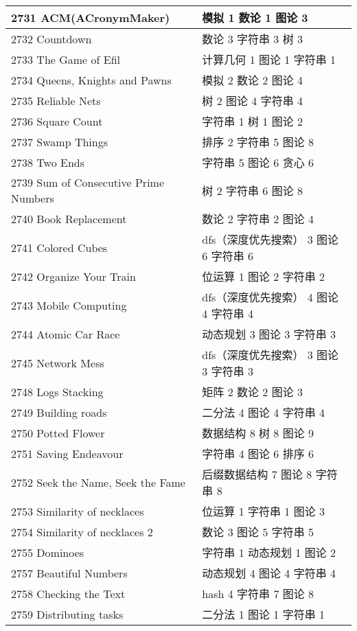 \begin{longtable}{| p{} | p{} |}
 2731 ACM(ACronymMaker)  & 模拟 1 数论 1 图论 3 \\ \hline
 2732 Countdown  & 数论 3 字符串 3 树 3 \\ \hline
 2733 The Game of Efil  & 计算几何 1 图论 1 字符串 1 \\ \hline
 2734 Queens, Knights and Pawns  & 模拟 2 数论 2 图论 4 \\ \hline
 2735 Reliable Nets  & 树 2 图论 4 字符串 4 \\ \hline
 2736 Square Count  & 字符串 1 树 1 图论 2 \\ \hline
 2737 Swamp Things  & 排序 2 字符串 5 图论 8 \\ \hline
 2738 Two Ends  & 字符串 5 图论 6 贪心 6 \\ \hline
 2739 Sum of Consecutive Prime Numbers  & 树 2 字符串 6 图论 8 \\ \hline
 2740 Book Replacement  & 数论 2 字符串 2 图论 4 \\ \hline
 2741 Colored Cubes  & dfs（深度优先搜索） 3 图论 6 字符串 6 \\ \hline
 2742 Organize Your Train  & 位运算 1 图论 2 字符串 2 \\ \hline
 2743 Mobile Computing  & dfs（深度优先搜索） 4 图论 4 字符串 4 \\ \hline
 2744 Atomic Car Race  & 动态规划 3 图论 3 字符串 3 \\ \hline
 2745 Network Mess  & dfs（深度优先搜索） 3 图论 3 字符串 3 \\ \hline
 2748 Logs Stacking  & 矩阵 2 数论 2 图论 3 \\ \hline
 2749 Building roads  & 二分法 4 图论 4 字符串 4 \\ \hline
 2750 Potted Flower  & 数据结构 8 树 8 图论 9 \\ \hline
 2751 Saving Endeavour  & 字符串 4 图论 6 排序 6 \\ \hline
 2752 Seek the Name, Seek the Fame  & 后缀数据结构 7 图论 8 字符串 8 \\ \hline
 2753 Similarity of necklaces  & 位运算 1 字符串 1 图论 3 \\ \hline
 2754 Similarity of necklaces 2  & 数论 3 图论 5 字符串 5 \\ \hline
 2755 Dominoes  & 字符串 1 动态规划 1 图论 2 \\ \hline
 2757 Beautiful Numbers  & 动态规划 4 图论 4 字符串 4 \\ \hline
 2758 Checking the Text  & hash 4 字符串 7 图论 8 \\ \hline
 2759 Distributing tasks  & 二分法 1 图论 1 字符串 1 \\ \hline

\end{longtable}
